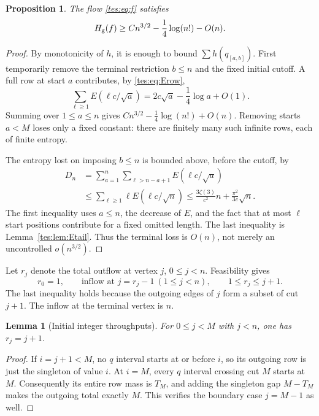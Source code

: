 \documentclass[11pt,a4paper]{article}
\newtheorem{lemma}[theorem]{Lemma}
\newtheorem{proposition}[theorem]{Proposition}
\theoremstyle{remark}\newtheorem{remark}[theorem]{Remark}
\newcommand{\Hg}{H_{\rm g}}\newcommand{\floor}[1]{\left\lfloor#1\right\rfloor}
\numberwithin{equation}{section}
\begin{document}
\begin{proposition}\label{tes:prop:entropy}
The flow \eqref{tes:eq:f} satisfies
\begin{equation}\label{tes:eq:Hg}
\Hg(f)\ge Cn^{3/2}-\frac14\log(n!)-O(n).
\end{equation}
\end{proposition}
\begin{proof}
By monotonicity of $h$, it is enough to bound $\sum h(q_{[a,b]})$. First temporarily remove the terminal restriction $b\le n$ and the fixed initial cutoff. A full row at start $a$ contributes, by \eqref{tes:eq:Erow},
\[
\sum_{\ell\ge1}E(\ell c/\sqrt a)
=2c\sqrt a-\frac14\log a+O(1).
\]
Summing over $1\le a\le n$ gives $Cn^{3/2}-\tfrac14\log(n!)+O(n)$. Removing starts $a<M$ loses only a fixed constant: there are finitely many such infinite rows, each of finite entropy.

The entropy lost on imposing $b\le n$ is bounded above, before the cutoff, by
\begin{align*}
D_n&=\sum_{a=1}^n\sum_{\ell>n-a+1}E(\ell c/\sqrt a)\\
&\le\sum_{\ell\ge1}\ell E(\ell c/\sqrt n)
\le\frac{3\zeta(3)}{c^2}n+\frac{\pi^2}{3c}\sqrt n.
\end{align*}
The first inequality uses $a\le n$, the decrease of $E$, and the fact that at most $\ell$ start positions contribute for a fixed omitted length. The last inequality is Lemma~\ref{tes:lem:Etail}. Thus the terminal loss is $O(n)$, not merely an uncontrolled $o(n^{3/2})$.
\end{proof}

Let $r_j$ denote the total outflow at vertex $j$, $0\le j<n$. Feasibility gives
\begin{equation}\label{tes:eq:r-basic}
r_0=1,\qquad \text{inflow at }j=r_j-1\ (1\le j<n),\qquad
1\le r_j\le j+1.
\end{equation}
The last inequality holds because the outgoing edges of $j$ form a subset of cut $j+1$. The inflow at the terminal vertex is $n$.

\begin{lemma}[Initial integer throughputs]\label{tes:lem:initial}
For $0\le j<M$ with $j<n$, one has $r_j=j+1$.
\end{lemma}
\begin{proof}
If $i=j+1<M$, no $q$ interval starts at or before $i$, so its outgoing row is just the singleton of value $i$. At $i=M$, every $q$ interval crossing cut $M$ starts at $M$. Consequently its entire row mass is $T_M$, and adding the singleton gap $M-T_M$ makes the outgoing total exactly $M$. This verifies the boundary case $j=M-1$ as well.
\end{proof}
\end{document}
